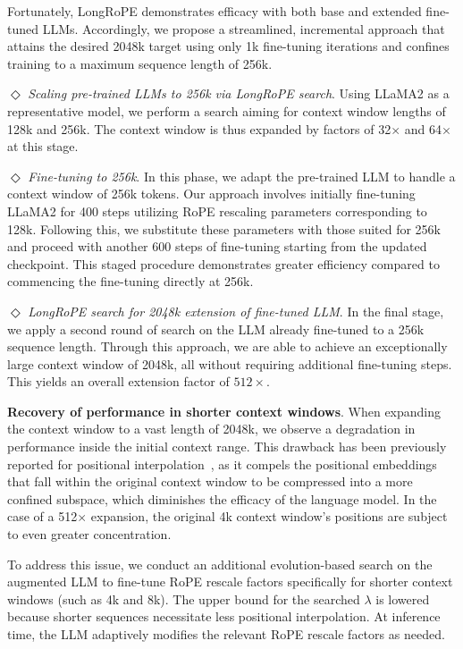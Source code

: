 Fortunately, LongRoPE demonstrates efficacy with both base and extended fine-tuned LLMs. Accordingly, we propose a streamlined, incremental approach that attains the desired 2048k target using only 1k fine-tuning iterations and confines training to a maximum sequence length of 256k.

$\Diamond$ \textit{Scaling pre-trained LLMs to 256k via LongRoPE search}. Using LLaMA2 as a representative model, we perform a search aiming for context window lengths of 128k and 256k. The context window is thus expanded by factors of 32$\times$ and 64$\times$ at this stage.

$\Diamond$ \textit{Fine-tuning to 256k}. In this phase, we adapt the pre-trained LLM to handle a context window of 256k tokens. Our approach involves initially fine-tuning LLaMA2 for 400 steps utilizing RoPE rescaling parameters corresponding to 128k. Following this, we substitute these parameters with those suited for 256k and proceed with another 600 steps of fine-tuning starting from the updated checkpoint. This staged procedure demonstrates greater efficiency compared to commencing the fine-tuning directly at 256k.

$\Diamond$ \textit{LongRoPE search for 2048k extension of fine-tuned LLM}. In the final stage, we apply a second round of search on the LLM already fine-tuned to a 256k sequence length. Through this approach, we are able to achieve an exceptionally large context window of 2048k, all without requiring additional fine-tuning steps. This yields an overall extension factor of $512\times$.

\textbf{Recovery of performance in shorter context windows}.  When expanding the context window to a vast length of 2048k, we observe a degradation in performance inside the initial context range. This drawback has been previously reported for positional interpolation~\cite{pi}, as it compels the positional embeddings that fall within the original context window to be compressed into a more confined subspace, which diminishes the efficacy of the language model. In the case of a 512$\times$ expansion, the original 4k context window's positions are subject to even greater concentration.

To address this issue, we conduct an additional evolution-based search on the augmented LLM to fine-tune RoPE rescale factors specifically for shorter context windows (such as 4k and 8k). The upper bound for the searched $\lambda$ is lowered because shorter sequences necessitate less positional interpolation. At inference time, the LLM adaptively modifies the relevant RoPE rescale factors as needed.

